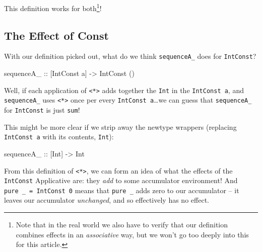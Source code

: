 \documentclass[]{article}
\newenvironment{Shaded}{}{}
\newcommand{\CommentTok}[1]{\textcolor[rgb]{0.38,0.63,0.69}{\textit{#1}}}
\newcommand{\DataTypeTok}[1]{\textcolor[rgb]{0.56,0.13,0.00}{#1}}
\newcommand{\DecValTok}[1]{\textcolor[rgb]{0.25,0.63,0.44}{#1}}
\newcommand{\FunctionTok}[1]{\textcolor[rgb]{0.02,0.16,0.49}{#1}}
\newcommand{\NormalTok}[1]{#1}
\newcommand{\OtherTok}[1]{\textcolor[rgb]{0.00,0.44,0.13}{#1}}
\begin{document}
\begin{Shaded}
\end{Shaded}

This definition works for both\footnote{Note that in the real world we also have
  to verify that our definition combines effects in an \emph{associative} way,
  but we won't go too deeply into this for this article.}!

\hypertarget{the-effect-of-const}{%
\subsection{The Effect of Const}\label{the-effect-of-const}}

With our definition picked out, what do we think \texttt{sequenceA\_} does for
\texttt{IntConst}?

\begin{Shaded}
\begin{Highlighting}[]
\OtherTok{sequenceA_ ::}\NormalTok{ [}\DataTypeTok{IntConst}\NormalTok{ a] }\OtherTok{->} \DataTypeTok{IntConst}\NormalTok{ ()}
\end{Highlighting}
\end{Shaded}

Well, if each application of \texttt{\textless{}*\textgreater{}} adds together
the \texttt{Int} in the \texttt{IntConst\ a}, and \texttt{sequenceA\_} uses
\texttt{\textless{}*\textgreater{}} once per every
\texttt{IntConst\ a}\ldots{}we can guess that \texttt{sequenceA\_} for
\texttt{IntConst} is just \texttt{sum}!

This might be more clear if we strip away the newtype wrappers (replacing
\texttt{IntConst\ a} with its contents, \texttt{Int}):

\begin{Shaded}
\begin{Highlighting}[]
\OtherTok{sequenceA_ ::}\NormalTok{ [}\DataTypeTok{Int}\NormalTok{] }\OtherTok{->} \DataTypeTok{Int}
\end{Highlighting}
\end{Shaded}

From this definition of \texttt{\textless{}*\textgreater{}}, we can form an idea
of what the effects of the \texttt{IntConst} Applicative are: they \emph{add} to
some accumulator environment! And \texttt{pure\ \_\ =\ IntConst\ 0} means that
\texttt{pure\ \_} adds zero to our accumulator -- it leaves our accumulator
\emph{unchanged}, and so effectively has no effect.
\end{document}
